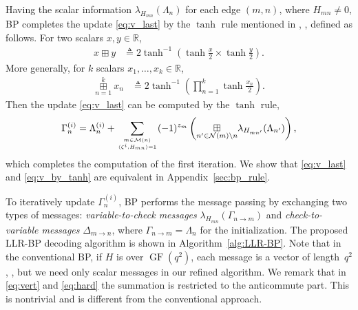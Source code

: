 \documentclass{ieeeaccess}
\DeclareMathOperator{\GF}{GF}
\newcommand{\teq}{\triangleq}
\newcommand{\sM}{{\cal M}}
\newcommand{\sN}{{\cal N}}
\newcommand{\RR}{{\mathbb R}}
\let\emph\textit
\theoremstyle{definition}		%
\begin{document}
Having the scalar information $\lambda_{H_{mn}}(\Lambda_n)$ for each edge $(m,n)$, where ${ H_{mn}\ne 0 }$, BP completes the update \eqref{eq:v_last} by the $\tanh$ rule mentioned in \cite{HOP96,KFL01}, \cite[Sec.~2.5.2]{RU08}, defined as follows.
%
	For two scalars $x,y\in\RR$,
	\begin{align}
	x \boxplus y  &\teq 2\tanh^{-1}\left( \tanh\frac{x}{2} \times \tanh\frac{y}{2} \right). \label{eq:bplus}
	\end{align}
	More generally, for $k$ scalars $x_1,\dots,x_k \in \RR$, 
	\begin{align}
	\overset{k}{\underset{n=1}{\boxplus}} x_n &\teq 2\tanh^{-1}\left( {\textstyle \prod_{n=1}^k} \tanh\frac{x_n}{2} \right). \label{eq:bsum} 
	\end{align}
%
Then the update \eqref{eq:v_last} can be computed by the $\tanh$ rule,
	\begin{equation} \label{eq:v_by_tanh}
	\Gamma_n^{(i)} = \Lambda_n^{(i)} + \sum_{m\in\sM(n) \atop  \langle \zeta^i, H_{mn} \rangle=1  } (-1)^{z_m} \left( \underset{n'\in\sN(m)\setminus n}{\boxplus} \lambda_{H_{mn'}}(\Lambda_{n'}) \right),
	\end{equation}
which completes the computation of the first iteration.
We show that \eqref{eq:v_last} and \eqref{eq:v_by_tanh} are equivalent in Appendix~\ref{sec:bp_rule}.


To iteratively update $\Gamma_n^{(i)}$, BP performs the message passing \cite{Pea88,WLK95} by exchanging two types of messages:
\emph{variable-to-check messages} $\lambda_{H_{mn}}(\Gamma_{n\to m})$ and \emph{check-to-variable messages} $\Delta_{m\to n}$, 
where $\Gamma_{n\to m}=\Lambda_n$ for the initialization.
%
The proposed LLR-BP decoding algorithm is shown in Algorithm~\ref{alg:LLR-BP}. 
%
Note that in the conventional BP, if $H$ is over $\GF(q^2)$, each message is a vector of length~$q^2$ \cite{DM98,MD01,DF07}, \cite{PC08,Wan+12,Bab+15},
but we need only scalar messages in our refined algorithm.
%
We remark that in \eqref{eq:vert} and \eqref{eq:hard} the summation is restricted to the anticommute part. 
	This is nontrivial and is different from the conventional approach.
\end{document}
